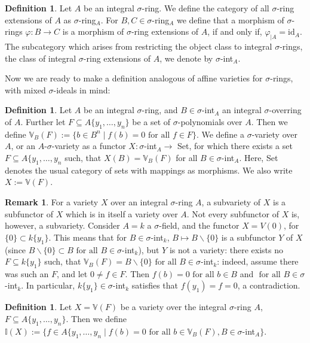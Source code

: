 \documentclass{article}
\def\I{\mathbb{I}}
\def\VV{\mathbb{V}}
\def\s{\sigma}
\def\id{\text{id}}
\def\fa{\text{ for all }}
\theoremstyle{definition}
\newtheorem{rem}[Satz]{Remark}
\newtheorem{defn}[Satz]{Definition}
\begin{document}
\begin{defn}
Let $A$ be an integral $\s$-ring. We define the category of all $\s$-ring extensions of $A$ as $\s$-ring$_A$.
For $B,C \in \s$-ring$_A$ we define that a morphism of $\s$-rings $\varphi: B \rightarrow C$ is a morphism of $\s$-ring extensions of $A$, if and only if, $\varphi_{|A} = \id_A$.
The subcategory which arises from restricting the object class to integral $\s$-rings, the class of integral $\s$-ring extensions of $A$, we denote by $\s$-int$_A$.
\end{defn}

Now we are ready to make a definition analogous of affine varieties for $\s$-rings, with mixed $\s$-ideals in mind:

\begin{defn}
Let $A$ be an integral $\s$-ring, and $B \in \s$-int$_A$ an integral $\s$-overring of $A$. Further let $F \subseteq A\{y_1, \ldots, y_n\}$ be a set of $\s$-polynomials over $A$. 
Then we define $\VV_B(F):= \{ b \in B^n \mid f(b) = 0 \fa f \in F \}$. We define a $\s$-variety over $A$, or an $A$-$\s$-variety as a functor $X: \s$-int$_A \rightarrow$ Set, for which there exists a set $F \subseteq A\{y_1, \ldots, y_n$ such, that $X(B) = \VV_B(F)$ for all $B \in \s$-int$_A$.
Here, Set denotes the usual category of sets with mappings as morphisms. We also write $X := \VV(F)$. \index{$\s$-variety}
\end{defn}

\begin{rem}
For a variety $X$ over an integral $\s$-ring $A$, a subvariety of $X$ is a subfunctor of $X$ which is in itself a variety over $A$. Not every subfunctor of $X$ is, however, a subvariety. Consider $A = k$ a $\s$-field,
and the functor $X = V(0)$, for $\{0\} \subset k\{y_1\}$. This means that for $B \in \s$-int$_k$, $B \mapsto B\backslash \{0\}$ is a subfunctor $Y$ of $X$ (since $B \backslash \{ 0 \} \subset B \fa B \in \s$-int$_k$), but $Y$ is not a variety:
there exists no $F \subseteq k\{y_1\}$ such, that $\VV_B(F) = B \backslash \{ 0 \} \fa B \in \s$-int$_k$: indeed, assume there was such an $F$, and let $0 \neq f \in F$. Then $f(b) = 0 \fa b \in B$ and $\fa B \in \s$-int$_k$. In particular,
$k\{y_1\} \in \s$-int$_k$ satisfies that $f(y_1) = f = 0$, a contradiction. 
\end{rem}

\begin{defn}
Let $X = \VV(F)$ be a variety over the integral $\s$-ring $A$, $F \subseteq A\{y_1,\ldots,y_n\}$. Then we define $\I(X):= \{ f \in A\{y_1,\ldots,y_n \mid f(b) = 0 \fa b \in \VV_B(F), B \in \s$-int$_A \}$.
\end{defn}
\end{document}
